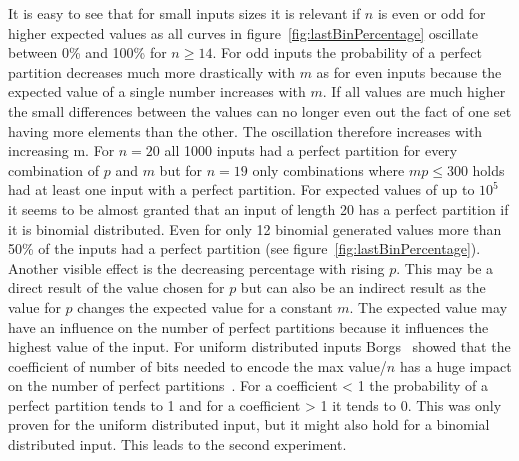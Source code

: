 It is easy to see that for small inputs sizes it is relevant if $n$ is even or odd for higher expected values as all curves in figure~\ref{fig:lastBinPercentage} oscillate between 0\% and 100\% for $n\ge14$.
For odd inputs the probability of a perfect partition decreases much more drastically with $m$ as for even inputs because the expected value of a single number increases with $m$.
If all values are much higher the small differences between the values can no longer even out the fact of one set having more elements than the other.
The oscillation therefore increases with increasing m.
For $n=20$ all 1000 inputs had a perfect partition for every combination of $p$ and $m$ but for $n=19$ only combinations where $mp\le300$ holds had at least one input with a perfect partition.
For expected values of up to $10^5$ it seems to be almost granted that an input of length 20 has a perfect partition if it is binomial distributed.
Even for only 12 binomial generated values more than 50\% of the inputs had a perfect partition (see figure~\ref{fig:lastBinPercentage}).
Another visible effect is the decreasing percentage with rising $p$.
This may be a direct result of the value chosen for $p$ but can also be an indirect result as the value for $p$ changes the expected value for a constant $m$.
The expected value may have an influence on the number of perfect partitions because it influences the highest value of the input.
For uniform distributed inputs Borgs \etal~showed that the coefficient of number of bits needed to encode the max value/$n$ has a huge impact on the number of perfect partitions~\cite{borgs2001phase}.
For a coefficient < 1 the probability of a perfect partition tends to 1 and for a coefficient > 1 it tends to 0.
This was only proven for the uniform distributed input, but it might also hold for a binomial distributed input.
This leads to the second experiment.

